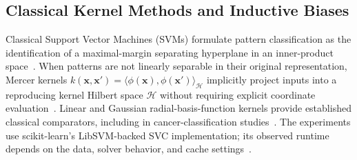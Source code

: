 \documentclass[12pt,a4paper]{article}
\begin{document}
\subsection{Classical Kernel Methods and Inductive Biases}
Classical Support Vector Machines (SVMs) formulate pattern classification as the identification of a maximal-margin separating hyperplane in an inner-product space~\cite{cortes1995support, scholkopf2002learning}. When patterns are not linearly separable in their original representation, Mercer kernels $k(\mathbf{x}, \mathbf{x}') = \langle \phi(\mathbf{x}), \phi(\mathbf{x}') \rangle_{\mathcal{H}}$ implicitly project inputs into a reproducing kernel Hilbert space $\mathcal{H}$ without requiring explicit coordinate evaluation~\cite{cristianini2000introduction}. Linear and Gaussian radial-basis-function kernels provide established classical comparators, including in cancer-classification studies~\cite{guyon2002gene}. The experiments use scikit-learn's LibSVM-backed SVC implementation; its observed runtime depends on the data, solver behavior, and cache settings~\cite{chang2011libsvm, pedregosa2011scikit}.
\end{document}
